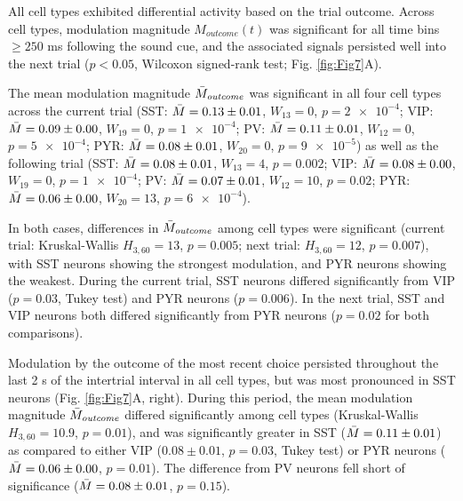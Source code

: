 All cell types exhibited differential activity based on the trial outcome. Across cell types, modulation magnitude $M_{\mathit{outcome}}(t)$ was significant for all time bins $\ge 250$ ms following the sound cue, and the associated signals persisted well into the next trial ($p<0.05$, Wilcoxon signed-rank test; Fig. \ref{fig:Fig7}A). 


The mean modulation magnitude $\Bar{M}_{\mathit{outcome}}$ was significant in all four cell types across the current trial (SST: $\Bar{M}=0.13\pm0.01$, $W_{13}=0$, $p=\num{2e-4}$; VIP: $\Bar{M}=0.09\pm0.00$, $W_{19}=0$, $p=\num{1e-4}$; PV: $\Bar{M}=0.11\pm0.01$, $W_{12}=0$, $p=\num{5e-4}$; PYR: $\Bar{M}=0.08\pm0.01$, $W_{20}=0$, $p=\num{9e-5}$) as well as the following trial (SST: $\Bar{M}=0.08\pm0.01$, $W_{13}=4$, $p=\num{0.002}$; VIP: $\Bar{M}=0.08\pm0.00$, $W_{19}=0$, $p=\num{1e-4}$; PV: $\Bar{M}=0.07\pm0.01$, $W_{12}=10$, $p=\num{0.02}$; PYR: $\Bar{M}=0.06\pm0.00$, $W_{20}=13$, $p=\num{6e-4}$). 

In both cases, differences in $\Bar{M}_{\mathit{outcome}}$ among cell types were significant (current trial: Kruskal-Wallis $H_{3,60}=13$, $p=0.005$; next trial: $H_{3,60}=12$, $p=0.007$), with SST neurons showing the strongest modulation, and PYR neurons showing the weakest. During the current trial, SST neurons differed significantly from VIP ($p=0.03$, Tukey test) and PYR neurons ($p=0.006$). In the next trial, SST and VIP neurons both differed significantly from PYR neurons ($p=0.02$ for both comparisons). 

Modulation by the outcome of the most recent choice persisted throughout the last 2 s of the intertrial interval in all cell types, but was most pronounced in SST neurons (Fig. \ref{fig:Fig7}A, right). During this period, the mean modulation magnitude $\Bar{M}_{\mathit{outcome}}$ differed significantly among cell types (Kruskal-Wallis $H_{3,60}=10.9$, $p=0.01$), and was significantly greater in SST ($\Bar{M}=0.11\pm0.01$) as compared to either VIP ($0.08\pm0.01$, $p=0.03$, Tukey test) or PYR neurons ($\Bar{M}=0.06\pm0.00$, $p=0.01$). The difference from PV neurons fell short of significance ($\Bar{M}=0.08\pm0.01$, $p=0.15$). 

